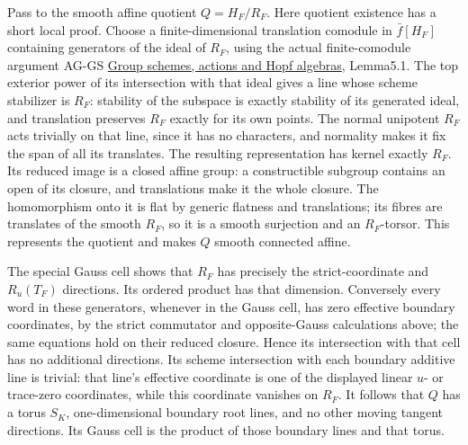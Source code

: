 \documentclass[
  11pt,
]{article}
\begin{document}
Pass to the smooth affine quotient \(Q=H_F/R_F\). Here quotient
existence has a short local proof. Choose a finite-dimensional
translation comodule in \(\bar f[H_F]\) containing generators of the
ideal of \(R_F\), using the actual finite-comodule argument AG-GS
\href{../AG-GS/AG-GS-01.html}{Group schemes, actions and Hopf algebras},
Lemma5.1. The top exterior power of its intersection with that ideal
gives a line whose scheme stabilizer is \(R_F\): stability of the
subspace is exactly stability of its generated ideal, and translation
preserves \(R_F\) exactly for its own points. The normal unipotent
\(R_F\) acts trivially on that line, since it has no characters, and
normality makes it fix the span of all its translates. The resulting
representation has kernel exactly \(R_F\). Its reduced image is a closed
affine group: a constructible subgroup contains an open of its closure,
and translations make it the whole closure. The homomorphism onto it is
flat by generic flatness and translations; its fibres are translates of
the smooth \(R_F\), so it is a smooth surjection and an \(R_F\)-torsor.
This represents the quotient and makes \(Q\) smooth connected affine.

The special Gauss cell shows that \(R_F\) has precisely the
strict-coordinate and \(R_u(T_F)\) directions. Its ordered product has
that dimension. Conversely every word in these generators, whenever in
the Gauss cell, has zero effective boundary coordinates, by the strict
commutator and opposite-Gauss calculations above; the same equations
hold on their reduced closure. Hence its intersection with that cell has
no additional directions. Its scheme intersection with each boundary
additive line is trivial: that line's effective coordinate is one of the
displayed linear \(u\)- or trace-zero coordinates, while this coordinate
vanishes on \(R_F\). It follows that \(Q\) has a torus \(S_K\),
one-dimensional boundary root lines, and no other moving tangent
directions. Its Gauss cell is the product of those boundary lines and
that torus.
\end{document}
